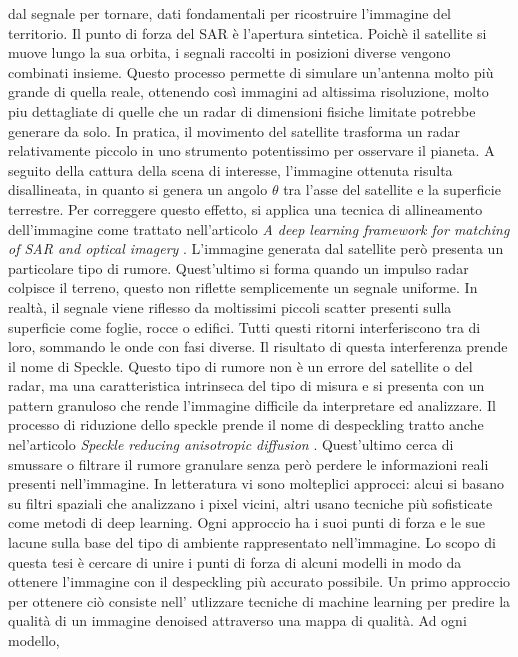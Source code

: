 dal segnale per tornare, dati fondamentali per ricostruire l'immagine del territorio. Il punto 
di forza del SAR è l'apertura sintetica. Poichè il satellite si muove lungo la sua orbita, i 
segnali raccolti in posizioni diverse vengono combinati insieme. Questo processo permette di 
simulare un'antenna molto più grande di quella reale, ottenendo così immagini ad altissima 
risoluzione, molto piu dettagliate di quelle che un radar di dimensioni fisiche limitate potrebbe 
generare da solo. In pratica, il movimento del satellite trasforma un radar relativamente piccolo 
in uno strumento potentissimo per osservare il pianeta. 
A seguito della cattura della scena di interesse, l’immagine ottenuta risulta disallineata, 
in quanto si genera un angolo $\theta$ tra l’asse del satellite e la superficie terrestre. 
Per correggere questo effetto, si applica una tecnica di allineamento dell’immagine come trattato nell'articolo \textit{A deep learning framework for matching of SAR and optical imagery} \cite{HUGHES2020166}.
L'immagine generata dal satellite però presenta un particolare tipo di rumore. Quest'ultimo si forma quando un impulso radar colpisce il terreno, 
questo non riflette semplicemente un segnale uniforme. In realtà, il segnale viene riflesso da 
moltissimi piccoli scatter presenti sulla superficie come foglie, rocce o edifici. Tutti questi 
ritorni interferiscono tra di loro, sommando le onde con fasi diverse. Il risultato di questa 
interferenza prende il nome di Speckle. Questo tipo di rumore non è un errore del satellite o 
del radar, ma una caratteristica intrinseca del tipo di misura e si presenta con un pattern granuloso
che rende l'immagine difficile da interpretare ed analizzare. Il processo di riduzione dello speckle 
prende il nome di despeckling tratto anche nel'articolo \textit{Speckle reducing anisotropic diffusion} \cite{1097762}. Quest'ultimo cerca di smussare o filtrare il rumore granulare senza 
però perdere le informazioni reali presenti nell'immagine. In letteratura vi sono molteplici 
approcci: alcui si basano su filtri spaziali che analizzano i pixel vicini, altri usano tecniche 
più sofisticate come metodi di deep learning. Ogni approccio ha i suoi
punti di forza e le sue lacune sulla base del tipo di ambiente rappresentato nell'immagine. 
Lo scopo di questa tesi è cercare di unire i punti di forza di alcuni modelli in modo da ottenere l’immagine
con il despeckling più accurato possibile. Un primo approccio per ottenere ciò consiste nell' utlizzare tecniche di machine learning
per predire la qualità di un immagine denoised attraverso una mappa di qualità. Ad ogni modello,
